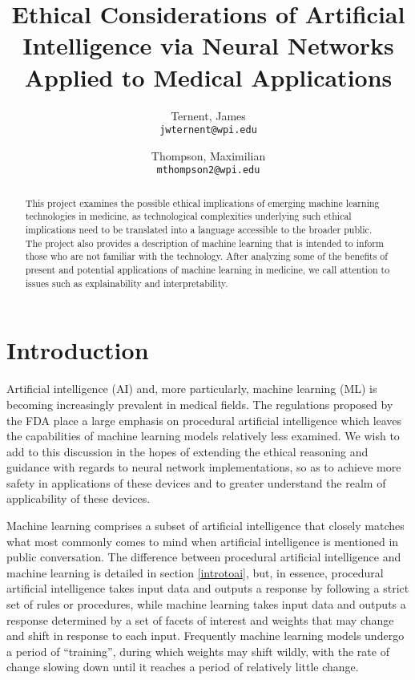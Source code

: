 \documentclass[]{article}
\title{Ethical Considerations of Artificial Intelligence via Neural Networks Applied to Medical Applications}
\author{
  Ternent, James\\
  \texttt{jwternent@wpi.edu}
  \and
  Thompson, Maximilian\\
  \texttt{mthompson2@wpi.edu}
}
\begin{document}
	
	\maketitle
	
	\begin{abstract}
		This project examines the possible ethical implications of emerging machine learning technologies in medicine, as technological complexities underlying such ethical implications need to be translated into a language accessible to the broader public. The project also provides a description of machine learning that is intended to inform those who are not familiar with the technology. After analyzing some of the benefits of present and potential applications of machine learning in medicine, we call attention to issues such as explainability and interpretability.
	\end{abstract}
	
	\section{Introduction}
	
		Artificial intelligence (AI) and, more particularly, machine learning (ML) is becoming increasingly prevalent in medical fields. The regulations proposed by the FDA\cite{fdaregproposal} place a large emphasis on procedural artificial intelligence which leaves the capabilities of machine learning models relatively less examined. We wish to add to this discussion in the hopes of extending the ethical reasoning and guidance with regards to neural network implementations, so as to achieve more safety in applications of these devices and to greater understand the realm of applicability of these devices.

		Machine learning comprises a subset of artificial intelligence that closely matches what most commonly comes to mind when artificial intelligence is mentioned in public conversation. The difference between procedural artificial intelligence and machine learning is detailed in section \ref{introtoai}, but, in essence, procedural artificial intelligence takes input data and outputs a response by following a strict set of rules or procedures, while machine learning takes input data and outputs a response determined by a set of facets of interest and weights that may change and shift in response to each input. Frequently machine learning models undergo a period of ``training'', during which weights may shift wildly, with the rate of change slowing down until it reaches a period of relatively little change.
\end{document}
